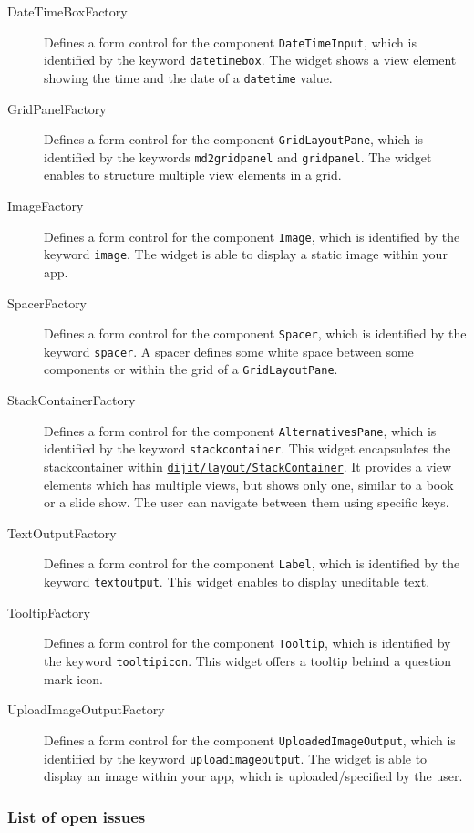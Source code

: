 \begin{description}
	\item[DateTimeBoxFactory] Defines a form control for the component \lstinline|DateTimeInput|, which is identified by the keyword \lstinline|datetimebox|. The widget shows a view element showing the time and the date of a \lstinline|datetime| value.
	\item[GridPanelFactory] Defines a form control for the component \lstinline|GridLayoutPane|, which is identified by the keywords \lstinline|md2gridpanel| and \lstinline|gridpanel|. The widget enables to structure multiple view elements in a grid.
	\item[ImageFactory] Defines a form control for the component \lstinline|Image|, which is identified by the keyword \lstinline|image|. The widget is able to display a static image within your app.
	\item[SpacerFactory] Defines a form control for the component \lstinline|Spacer|, which is identified by the keyword \lstinline|spacer|. A spacer defines some white space between some components or within the grid of a \lstinline|GridLayoutPane|.
	\item[StackContainerFactory] Defines a form control for the component \lstinline|AlternativesPane|, which is identified by the keyword \lstinline|stackcontainer|. This widget encapsulates the stackcontainer within \href{http://dojotoolkit.org/reference-guide/1.10/dijit/layout/StackContainer.html}{\lstinline|dijit/layout/StackContainer|}. It provides a view elements which has multiple views, but shows only one, similar to a book or a slide show. The user can navigate between them using specific keys. 
	\item[TextOutputFactory] Defines a form control for the component \lstinline|Label|, which is identified by the keyword \lstinline|textoutput|. This widget enables to display uneditable text.
	\item[TooltipFactory] Defines a form control for the component \lstinline|Tooltip|, which is identified by the keyword \lstinline|tooltipicon|. This widget offers a tooltip behind a question mark icon.
	\item[UploadImageOutputFactory] Defines a form control for the component \lstinline|UploadedImageOutput|, which is identified by the keyword \lstinline|uploadimageoutput|. The widget is able to display an image within your app, which is uploaded/specified by the user.
\end{description}

\subsubsection{List of open issues}
\label{sec:listOfOpenIssues}

